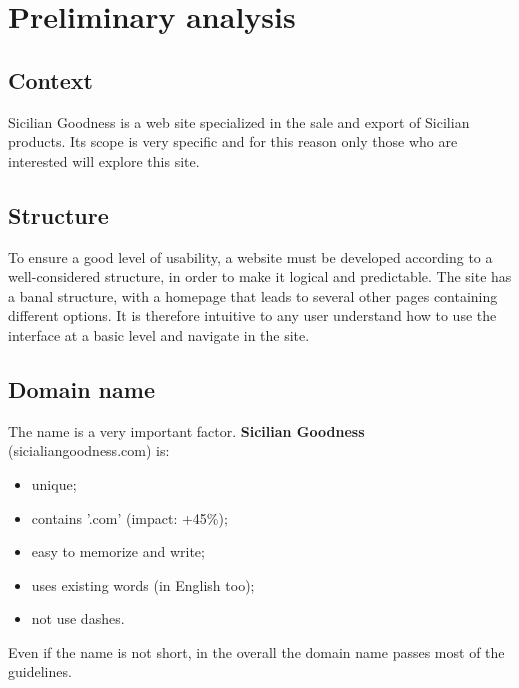 \section{Preliminary analysis}

\subsection{Context}
Sicilian Goodness is a web site specialized in the sale and export of Sicilian products.
Its scope is very specific and for this reason only those who are interested will explore this site. 

\subsection{Structure}
To ensure a good level of usability, a website must be developed according to a well-considered structure, in order to make it logical and predictable. The site has a banal structure, with a homepage that leads to several other pages containing different options. It is therefore intuitive to any user understand how to use the interface at a basic level and navigate in the site.

\subsection{Domain name}
The name is a very important factor. \newline
\textbf{Sicilian Goodness} (sicialiangoodness.com) is:
\begin{itemize}
	\item unique;
	\item contains '.com' (impact: +45\%);
	\item easy to memorize and write;
	\item uses existing words (in English too);
	\item not use dashes.
\end{itemize}

Even if the name is not short, in the overall the domain name passes most of the guidelines.


\pagebreak
